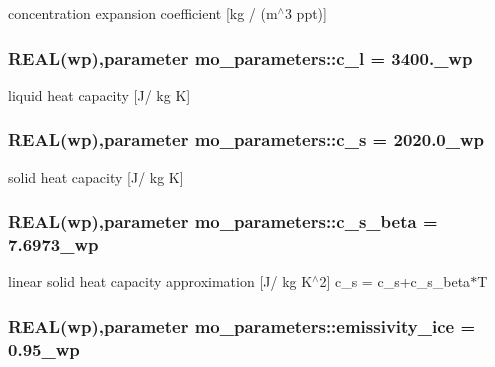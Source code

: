 concentration expansion coefficient \mbox{[}kg / (m$^\wedge$3 ppt)\mbox{]} 

\hypertarget{namespacemo__parameters_a53f3c50306e6d9fb7928aacdd48d9776}{
\subsubsection[{c\_\-l}]{\setlength{\rightskip}{0pt plus 5cm}REAL({\bf wp}),parameter {\bf mo\_\-parameters::c\_\-l} = 3400.\_\-wp}}
\label{namespacemo__parameters_a53f3c50306e6d9fb7928aacdd48d9776}


liquid heat capacity \mbox{[}J/ kg K\mbox{]} 

\hypertarget{namespacemo__parameters_ab81b5df9bf526e14b97f78bcf35019bf}{
\subsubsection[{c\_\-s}]{\setlength{\rightskip}{0pt plus 5cm}REAL({\bf wp}),parameter {\bf mo\_\-parameters::c\_\-s} = 2020.0\_\-wp}}
\label{namespacemo__parameters_ab81b5df9bf526e14b97f78bcf35019bf}


solid heat capacity \mbox{[}J/ kg K\mbox{]} 

\hypertarget{namespacemo__parameters_a9e6e68ac08c908458ac6e50a72e66ad9}{
\subsubsection[{c\_\-s\_\-beta}]{\setlength{\rightskip}{0pt plus 5cm}REAL({\bf wp}),parameter {\bf mo\_\-parameters::c\_\-s\_\-beta} = 7.6973\_\-wp}}
\label{namespacemo__parameters_a9e6e68ac08c908458ac6e50a72e66ad9}


linear solid heat capacity approximation \mbox{[}J/ kg K$^\wedge$2\mbox{]} c\_\-s = c\_\-s+c\_\-s\_\-beta$\ast$T 

\hypertarget{namespacemo__parameters_a7a1d89915a6383896c6ec8b1a13208e5}{
\subsubsection[{emissivity\_\-ice}]{\setlength{\rightskip}{0pt plus 5cm}REAL({\bf wp}),parameter {\bf mo\_\-parameters::emissivity\_\-ice} = 0.95\_\-wp}}
\label{namespacemo__parameters_a7a1d89915a6383896c6ec8b1a13208e5}



